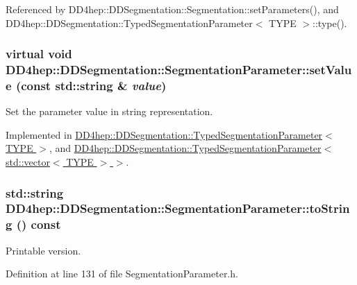 Referenced by DD4hep::DDSegmentation::Segmentation::setParameters(), and DD4hep::DDSegmentation::TypedSegmentationParameter$<$ TYPE $>$::type().\hypertarget{class_d_d4hep_1_1_d_d_segmentation_1_1_segmentation_parameter_a91e9dae172660687daec4de4d730b192}{
\subsubsection[{setValue}]{\setlength{\rightskip}{0pt plus 5cm}virtual void DD4hep::DDSegmentation::SegmentationParameter::setValue (const std::string \& {\em value})}}
\label{class_d_d4hep_1_1_d_d_segmentation_1_1_segmentation_parameter_a91e9dae172660687daec4de4d730b192}


Set the parameter value in string representation. 

Implemented in \hyperlink{class_d_d4hep_1_1_d_d_segmentation_1_1_typed_segmentation_parameter_a32e4b30c056572c1892b0607d05774e2}{DD4hep::DDSegmentation::TypedSegmentationParameter$<$ TYPE $>$}, and \hyperlink{class_d_d4hep_1_1_d_d_segmentation_1_1_typed_segmentation_parameter_3_01std_1_1vector_3_01_t_y_p_e_01_4_01_4_ad36f5a4953d42c4d9252423f129c50de}{DD4hep::DDSegmentation::TypedSegmentationParameter$<$ std::vector$<$ TYPE $>$ $>$}.\hypertarget{class_d_d4hep_1_1_d_d_segmentation_1_1_segmentation_parameter_aaa7b5fba3682674663901a11fc8a22b8}{
\subsubsection[{toString}]{\setlength{\rightskip}{0pt plus 5cm}std::string DD4hep::DDSegmentation::SegmentationParameter::toString () const}}
\label{class_d_d4hep_1_1_d_d_segmentation_1_1_segmentation_parameter_aaa7b5fba3682674663901a11fc8a22b8}


Printable version. 

Definition at line 131 of file SegmentationParameter.h.

